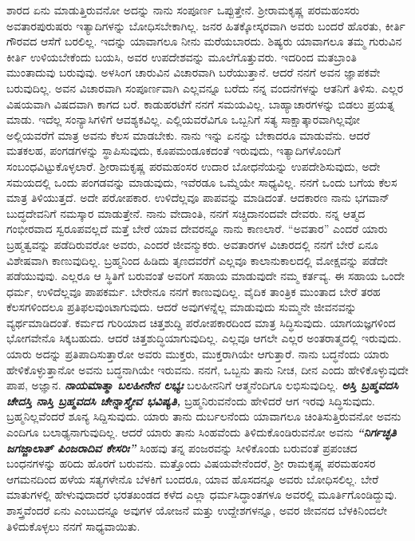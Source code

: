 ಶಾರದ ಏನು ಮಾಡುತ್ತಿರುವನೋ ಅದನ್ನು ನಾನು ಸಂಪೂರ್ಣ ಒಪ್ಪುತ್ತೇನೆ. ಶ‍್ರೀರಾಮ\break ಕೃಷ್ಣ ಪರಮಹಂಸರು ಅವತಾರಪುರುಷರು ಇತ್ಯಾದಿಗಳನ್ನು ಬೋಧಿಸಬೇಕಾಗಿಲ್ಲ. ಜನರ ಹಿತಕ್ಕೋಸ್ಕರವಾಗಿ ಅವರು ಬಂದರೆ ಹೊರತು, ಕೀರ್ತಿ ಗೌರವದ ಆಸೆಗೆ ಬರಲಿಲ್ಲ. ಇದನ್ನು ಯಾವಾಗಲೂ ನೀನು ಮರೆಯಬಾರದು. ಶಿಷ್ಯರು ಯಾವಾಗಲೂ ತಮ್ಮ ಗುರುವಿನ ಕೀರ್ತಿ ಉಳಿಯಬೇಕೆಂದು ಬಯಸಿ, ಅವರ ಉಪದೇಶವನ್ನು ಮೂಲೆಗೊತ್ತುವರು. ಇದರಿಂದ ಮತಬ್ರಾಂತಿ ಮುಂತಾದುವು ಬರುವುವು. ಅಳಸಿಂಗ ಚಾರುವಿನ ವಿಚಾರವಾಗಿ ಬರೆಯುತ್ತಾನೆ. ಆದರೆ ನನಗೆ ಅವನ ಜ್ಞಾಪಕವೇ ಬರುವುದಿಲ್ಲ. ಅವನ ವಿಚಾರವಾಗಿ ಸಂಪೂರ್ಣವಾಗಿ ಎಲ್ಲವನ್ನೂ ಬರೆದು ನನ್ನ ವಂದನೆಗಳನ್ನು ಆತನಿಗೆ ತಿಳಿಸು. ಎಲ್ಲರ ವಿಷಯವಾಗಿ ವಿಷದವಾಗಿ ಕಾಗದ ಬರೆ. ಕಾಡುಹರಟೆಗೆ ನನಗೆ ಸಮಯವಿಲ್ಲ. ಬಾಹ್ಯಾಚಾರಗಳನ್ನು ಬಿಡಲು ಪ್ರಯತ್ನ ಮಾಡು. ಇದೆಲ್ಲ ಸಂನ್ಯಾಸಿಗಳಿಗೆ ಆವಶ್ಯಕವಿಲ್ಲ. ಎಲ್ಲಿಯವರೆವಿಗೂ ಒಬ್ಬನಿಗೆ ಸತ್ಯ ಸಾಕ್ಷಾತ್ಕಾರವಾಗಿಲ್ಲವೋ ಅಲ್ಲಿಯವರೆಗೆ ಮಾತ್ರ ಅವನು ಕೆಲಸ ಮಾಡಬೇಕು. ನಾನು ಇನ್ನು ಏನನ್ನು ಬೇಕಾದರೂ ಮಾಡುವೆನು. ಆದರೆ ಮತಕಲಹ, ಪಂಗಡಗಳನ್ನು ಸ್ಥಾಪಿಸುವುದು, ಕೂಪಮಂಡೂಕದಂತೆ ಇರುವುದು, ಇತ್ಯಾದಿಗಳೊಂದಿಗೆ ಸಂಬಂಧವಿಟ್ಟುಕೊಳ್ಳಲಾರೆ. ಶ‍್ರೀರಾಮಕೃಷ್ಣ ಪರಮಹಂಸರ ಉದಾರ ಬೋಧನೆಯನ್ನು ಉಪದೇಶಿಸುವುದು, ಅದೇ ಸಮಯದಲ್ಲಿ ಒಂದು ಪಂಗಡವನ್ನು ಮಾಡುವುದು, ಇವೆರಡೂ ಒಮ್ಮೆಯೇ ಸಾಧ್ಯವಿಲ್ಲ. ನನಗೆ ಒಂದು ಬಗೆಯ ಕೆಲಸ ಮಾತ್ರ ತಿಳಿಯುತ್ತದೆ. ಅದೇ ಪರೋಪಕಾರ. ಉಳಿದೆಲ್ಲವೂ ಪಾಪವನ್ನು ಮಾಡಿದಂತೆ. ಆದಕಾರಣ ನಾನು ಭಗವಾನ್ ಬುದ್ಧದೇವನಿಗೆ ನಮಸ್ಕಾರ ಮಾಡುತ್ತೇನೆ. ನಾನು ವೇದಾಂತಿ, ನನಗೆ ಸಚ್ಚಿದಾನಂದವೇ ದೇವರು. ನನ್ನ ಆತ್ಮದ ಗಂಭೀರವಾದ ಸ್ವರೂಪವಲ್ಲದೆ ಮತ್ತೆ ಬೇರೆ ಯಾವ ದೇವರನ್ನೂ ನಾನು ಕಾಣಲಾರೆ. “ಅವತಾರ'' ಎಂದರೆ ಯಾರು ಬ್ರಹ್ಮತ್ವವನ್ನು ಪಡೆದಿರುವರೋ ಅವರು, ಎಂದರೆ ಜೀವನ್ಮುಕರು. ಅವತಾರಗಳ ವಿಚಾರದಲ್ಲಿ ನನಗೆ ಬೇರೆ ಏನೂ ವಿಶೇಷವಾಗಿ ಕಾಣುವುದಿಲ್ಲ. ಬ್ರಹ್ಮನಿಂದ ಹಿಡಿದು ತೃಣದವರೆಗೆ ಎಲ್ಲವೂ ಕಾಲಾನುಕಾಲದಲ್ಲಿ ಮೋಕ್ಷವನ್ನು ಪಡೆದೇ ಪಡೆಯುವುವು. ಎಲ್ಲರೂ ಆ ಸ್ಥಿತಿಗೆ ಬರುವಂತೆ ಅವರಿಗೆ ಸಹಾಯ ಮಾಡುವುದೇ ನಮ್ಮ ಕರ್ತವ್ಯ. ಈ ಸಹಾಯ ಒಂದೇ ಧರ್ಮ, ಉಳಿದೆಲ್ಲವೂ ಪಾಪಕರ್ಮ. ಬೇರೇನೂ ನನಗೆ ಕಾಣುವುದಿಲ್ಲ. ವೈದಿಕ ತಾಂತ್ರಿಕ ಮುಂತಾದ ಬೇರೆ ತರಹ ಕೆಲಸಗಳಿಂದಲೂ ಪ್ರತಿಫಲವುಂಟಾಗುವುದು. ಆದರೆ ಅವುಗಳನ್ನೆಲ್ಲ ಮಾಡುವುದು ಸುಮ್ಮನೇ ಜೀವನವನ್ನು ವ್ಯರ್ಥಮಾಡಿದಂತೆ. ಕರ್ಮದ ಗುರಿಯಾದ ಚಿತ್ತಶುದ್ದಿ ಪರೋಪಕಾರದಿಂದ ಮಾತ್ರ ಸಿದ್ಧಿಸುವುದು. ಯಾಗಯಜ್ಞಗಳಿಂದ ಭೋಗವೇನೊ ಸಿಕ್ಕಬಹುದು. ಆದರೆ ಚಿತ್ತಶುದ್ಧಿಯಾಗುವುದಿಲ್ಲ. ಎಲ್ಲವೂ ಆಗಲೇ ಎಲ್ಲರ ಅಂತರಾತ್ಮದಲ್ಲಿ ಇರುವುದು. ಯಾರು ಅದನ್ನು ಪ್ರತಿಪಾದಿಸುತ್ತಾರೋ ಅವರು ಮುಕ್ತರು, ಮುಕ್ತರಾಗಿಯೇ ಆಗುತ್ತಾರೆ. ನಾನು ಬದ್ಧನೆಂದು ಯಾರು ಹೇಳಿಕೊಳ್ಳುತ್ತಾನೋ ಅವನು ಬದ್ಧನಾಗಿಯೇ ಇರುವನು. ನನಗೆ, ಒಬ್ಬನು ತಾನು ನೀಚ, ದೀನ ಎಂದು ಹೇಳಿಕೊಳ್ಳುವುದೇ ಪಾಪ, ಅಜ್ಞಾನ. \textbf{\textit{ನಾಯಮಾತ್ಮಾ ಬಲಹೀನೇನ ಲಭ್ಯಃ}} ಬಲಹೀನನಿಗೆ ಆತ್ಮನೆಂದಿಗೂ ಲಭಿಸುವುದಿಲ್ಲ. \textbf{\textit{ಅಸ್ತಿ ಬ್ರಹ್ಮವದಸಿ ಚೇದಸ್ತಿ ನಾಸ್ತಿ ಬ್ರಹ್ಮವದಸಿ ಚೇನ್ನಾಸ್ತ್ಯೇವ ಭವಿಷ್ಯತಿ, }} ಬ್ರಹ್ಮನಿರುವನೆಂದು ಹೇಳಿದರೆ ಆಗ ಇರವು ಸಿದ್ಧಿಸುವುದು. ಬ್ರಹ್ಮನಿಲ್ಲವೆಂದರೆ ಶೂನ್ಯ ಸಿದ್ದಿಸುವುದು. ಯಾರು ತಾನು ದುರ್ಬಲನೆಂದು ಯಾವಾಗಲೂ ಚಿಂತಿಸುತ್ತಿರುವನೋ ಅವನು ಎಂದಿಗೂ ಬಲಾಢ್ಯನಾಗುವುದಿಲ್ಲ. ಆದರೆ ಯಾರು ತಾನು ಸಿಂಹವೆಂದು ತಿಳಿದುಕೊಂಡಿರುವನೋ ಅವನು \textbf{\textit{``ನಿರ್ಗಚ್ಛತಿ ಜಗಜ್ಜಾಲಾತ್ ಪಿಂಜರಾದಿವ ಕೇಸರಿಃ''}}\enginline{-} ಸಿಂಹವು ತನ್ನ ಪಂಜರವನ್ನು ಸೀಳಿಕೊಂಡು ಬರುವಂತೆ ಪ್ರಪಂಚದ ಬಂಧನಗಳನ್ನು ಹರಿದು ಹೊರಗೆ ಬರುವನು. ಮತ್ತೊಂದು ವಿಷಯವೇನೆಂದರೆ, ಶ‍್ರೀ ರಾಮಕೃಷ್ಣ ಪರಮಹಂಸರ ಆಗಮನದಿಂದ ಹಳೆಯ ಸತ್ಯಗಳೇನೊ ಬೆಳಕಿಗೆ ಬಂದರೂ, ಯಾವ ಹೊಸದನ್ನೂ ಅವರು ಬೋಧಿಸಲಿಲ್ಲ. ಬೇರೆ ಮಾತುಗಳಲ್ಲಿ ಹೇಳುವುದಾದರೆ ಭರತಖಂಡದ ಕಳೆದ ಎಲ್ಲಾ ಧರ್ಮಸಿದ್ಧಾಂತಗಳೂ ಅವರಲ್ಲಿ ಮೂರ್ತಿಗೊಂಡಿದ್ದುವು. ಶಾಸ್ತ್ರವೆಂದರೆ ಏನು ಎಂಬುದನ್ನೂ ಅವುಗಳ ಯೋಜನೆ ಮತ್ತು ಉದ್ದೇಶಗಳನ್ನೂ, ಅವರ ಜೀವನದ ಬೆಳಕಿನಿಂದಲೇ ತಿಳಿದುಕೊಳ್ಳಲು ನನಗೆ ಸಾಧ್ಯವಾಯಿತು.


